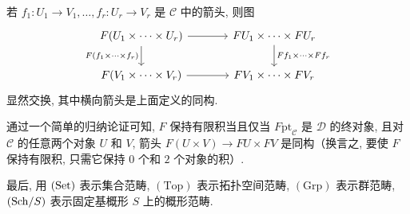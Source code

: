 若 $f_1\colon U_1\to V_1,\ldots,f_r\colon U_r\to V_r$ 是 $\mathcal C$ 中的箭头, 则图
\[\begin{tikzcd}[column sep=large]
 F(U_1\times\cdots\times U_r)\ar[r]\ar[d,"F(f_1\times\cdots\times f_r)"']&FU_1\times\cdots\times FU_r\ar[d,"Ff_1\times\cdots\times Ff_r"]\\
 F(V_1\times\cdots\times V_r)\ar[r]&FV_1\times\cdots\times FV_r
\end{tikzcd}\]
显然交换, 其中横向箭头是上面定义的同构.

通过一个简单的归纳论证可知, $F$ 保持有限积当且仅当 $F\mathrm{pt}_{\mathcal C}$ 是 $\mathcal D$ 的终对象, 且对 $\mathcal C$ 的任意两个对象 $U$ 和 $V$, 箭头 $F(U\times V)\to FU\times FV$ 是同构（换言之, 要使 $F$ 保持有限积, 只需它保持 $0$ 个和 $2$ 个对象的积）.

最后, 用 $(\mathrm{Set})$ 表示集合范畴, $(\mathrm{Top})$ 表示拓扑空间范畴, $(\mathrm{Grp})$ 表示群范畴, $(\mathrm{Sch}/S)$ 表示固定基概形 $S$ 上的概形范畴.
